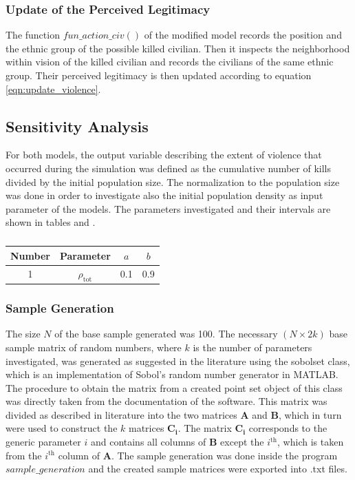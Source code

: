 \documentclass[11pt]{article}
\begin{document}
\subsubsection{Update of the Perceived Legitimacy}
The function $fun\_action\_civ()$ of the modified model records the position and the ethnic group of the possible killed civilian. Then it inspects the neighborhood within vision of the killed civilian and records the civilians of the same ethnic group. Their perceived legitimacy is then updated according to equation \eqref{eqn:update_violence}.

\subsection{Sensitivity Analysis}
For both models, the output variable describing the extent of violence that occurred during the simulation was defined as the cumulative number of kills divided by the initial population size. The normalization to the population size was done in order to investigate also the initial population density as input parameter of the models. The parameters investigated and their intervals are shown in tables and .
\begin{table}[!htbp]
	\centering
	\caption{}
	\vspace{0.5 cm}
		\begin{tabular}{c | c | c | c}
		Number & Parameter & $a$ & $b$\\
		\hline
		1 & $\rho_{\text{tot}}$ & 0.1 & 0.9\\
	\end{tabular}
	\label{tab:values_parameters}
\end{table}

\subsubsection{Sample Generation}
The size $N$ of the base sample generated was 100. The necessary $(N \times 2k)$ base sample matrix of random numbers, where $k$ is the number of parameters investigated, was generated as suggested in the literature using the sobolset class, which is an implementation of Sobol's random number generator in MATLAB. The procedure to obtain the matrix from a created point set object of this class was directly taken from the documentation of the software. This matrix was divided as described in literature into the two matrices $\boldsymbol{A}$ and $\boldsymbol{B}$, which in turn were used to construct the $k$ matrices $\boldsymbol{C_i}$. The matrix $\boldsymbol{C_i}$ corresponds to the generic parameter $i$ and contains all columns of $\boldsymbol{B}$ except the $i^{\text{th}}$, which is taken from the $i^{\text{th}}$ column of $\boldsymbol{A}$. The sample generation was done inside the program $sample\_generation$ and the created sample matrices were exported into .txt files.
\end{document}
